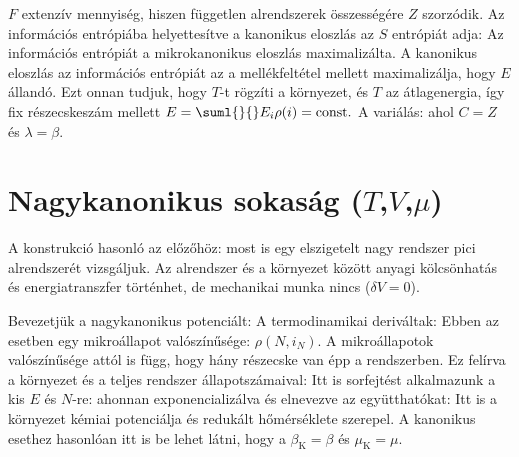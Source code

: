    $F$ extenzív mennyiség, hiszen független alrendszerek összességére $Z$ szorzódik.
   Az információs entrópiába helyettesítve a kanonikus eloszlás az $S$ entrópiát adja:
   Az információs entrópiát a mikrokanonikus eloszlás maximalizálta.
   A kanonikus eloszlás az információs entrópiát az a mellékfeltétel mellett maximalizálja, hogy $E$ állandó.
   Ezt onnan tudjuk, hogy $T$-t rögzíti a környezet, és $T$ az átlagenergia, így fix részecskeszám mellett $E=\suml{}{}E_i\rho(i)=\text{const.}$ A variálás:
   ahol $C=Z$ és $\lambda=\beta$. 
   
  \section{Nagykanonikus sokaság ($T$,$V$,$\mu$)}
   
   A konstrukció hasonló az előzőhöz: most is egy elszigetelt nagy rendszer pici alrendszerét vizsgáljuk.
   Az alrendszer és a környezet között anyagi kölcsönhatás és energiatranszfer történhet, de mechanikai munka nincs ($\delta V=0$). 
   
   Bevezetjük a nagykanonikus potenciált:
   A termodinamikai deriváltak:
   Ebben az esetben egy mikroállapot valószínűsége: $\rho(N,i_N)$.
   A mikroállapotok valószínűsége attól is függ, hogy hány részecske van épp a rendszerben.
   Ez felírva a környezet és a teljes rendszer állapotszámaival:
   Itt is sorfejtést alkalmazunk a kis $E$ és $N$-re:
   ahonnan exponencializálva és elnevezve az együtthatókat:
   Itt is a környezet kémiai potenciálja és redukált hőmérséklete szerepel.
   A kanonikus esethez hasonlóan itt is be lehet látni, hogy a $\beta_\text{K}=\beta$ és $\mu_\text{K}=\mu$.
   
